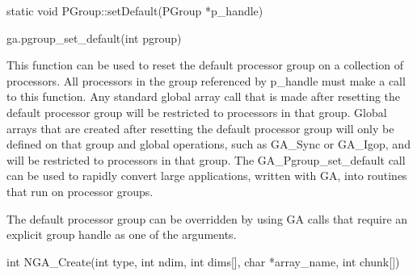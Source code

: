 \documentclass[10pt]{article}
\begin{document}
\begin{cxxapi}
\begin{cxxcode}
static void PGroup::setDefault(PGroup *p_handle)
\end{cxxcode}
\begin{funcargs}
\end{funcargs}
\end{cxxapi}

\begin{pyapi}
\begin{pycode}
ga.pgroup_set_default(int pgroup)
\end{pycode}
\begin{funcargs}
\end{funcargs}
\end{pyapi}

\gcoll

\begin{desc}

This function can be used to reset the default processor group on a collection
of processors. All processors in the group referenced by p_handle must make a
call to this function. Any standard global array call that is made after
resetting the default processor group will be restricted to processors in that
group. Global arrays that are created after resetting the default processor
group will only be defined on that group and global operations, such as GA_Sync
or GA_Igop, and will be restricted to processors in that group. The
GA_Pgroup_set_default call can be used to rapidly convert large applications,
written with GA, into routines that run on processor groups.

The default processor group can be overridden by using GA calls that require an
explicit group handle as one of the arguments.

\end{desc}


\begin{capi}
\begin{ccode}
int NGA_Create(int type, int ndim, int dims[], char *array_name, int chunk[])
\end{ccode}
\begin{funcargs}
\end{funcargs}
\end{capi}
\end{document}
